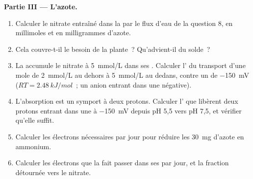 \begin{problem}
\medskip
\noindent\textbf{Partie III --- L'azote.}
\begin{enumerate}[resume]
  \item Calculer le nitrate entraîné dans la  par le flux d'eau
        de la question 8, en millimoles et en milligrammes d'azote.
  \item Cela couvre-t-il le besoin de la plante~? Qu'advient-il du
        solde~?
  \item La  accumule le nitrate à \qty{5}{mmol/L} dans ses
        . Calculer l' du transport d'une mole de
        \qty{2}{mmol/L} au dehors à \qty{5}{mmol/L} au dedans, contre
        un  de \qty{-150}{mV} ($RT = \qty{2.48}{kJ/mol}$~;
        un anion entrant dans une  négative).
  \item L'absorption est un symport à deux protons. Calculer l' que libèrent deux protons entrant dans une  à
        \qty{-150}{mV} depuis pH 5,5 vers pH 7,5, et vérifier qu'elle
        suffit.
  \item Calculer les électrons nécessaires par jour pour réduire les
        \qty{30}{mg} d'azote en ammonium.
  \item Calculer les électrons que la  fait passer dans ses
         par jour, et la fraction détournée vers le
        nitrate.
\end{enumerate}


\end{problem}
